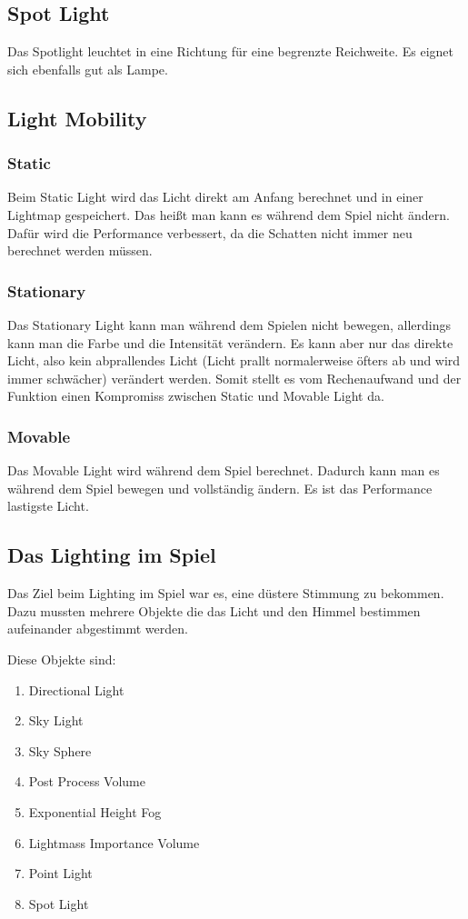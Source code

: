 \subsection{Spot Light}
Das Spotlight leuchtet in eine Richtung für eine begrenzte Reichweite. Es eignet sich ebenfalls gut als Lampe.

\subsection{Light Mobility}
\subsubsection{Static}
Beim Static Light wird das Licht direkt am Anfang berechnet und in einer Lightmap gespeichert. Das heißt man kann es während dem Spiel nicht ändern.
Dafür wird die Performance verbessert, da die Schatten nicht immer neu berechnet werden müssen. \citep{unreal:static_light}

\subsubsection{Stationary}
Das Stationary Light kann man während dem Spielen nicht bewegen, allerdings kann man die Farbe und die Intensität verändern. Es kann aber nur das direkte Licht, also kein
abprallendes Licht (Licht prallt normalerweise öfters ab und wird immer schwächer) verändert werden.
Somit stellt es vom Rechenaufwand und der Funktion einen Kompromiss zwischen Static und Movable Light da. \citep{unreal:stationary_light}

\subsubsection{Movable}
Das Movable Light wird während dem Spiel berechnet.
Dadurch kann man es während dem Spiel bewegen und vollständig ändern.
Es ist das Performance lastigste Licht. \citep{unreal:movable_light}

\subsection{Das Lighting im Spiel}
Das Ziel beim Lighting im Spiel war es, eine düstere Stimmung zu bekommen. Dazu mussten mehrere Objekte die das Licht und den Himmel bestimmen aufeinander abgestimmt werden.

Diese Objekte sind:
\begin{enumerate}
    \item Directional Light
    \item Sky Light
    \item Sky Sphere
    \item Post Process Volume
    \item Exponential Height Fog
    \item Lightmass Importance Volume
    \item Point Light
    \item Spot Light
\end{enumerate}


